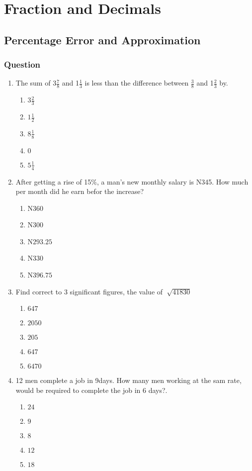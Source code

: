 \chapter{Fraction and Decimals}
\section{Percentage Error and Approximation}
\subsection{Question}
\begin{multicols}{2}
\begin{enumerate}[label={\arabic*.}]
\item The sum of 3\(\frac {7}{8}\) and 1\(\frac{1}{3}\) is less than the difference between \(\frac {3}{8}\) and 1\(\frac{2}{3}\) by.
    \begin{enumerate}[label={\Alph*.}]
    \item \(3\frac{2}{3}\)
    \item \(1\frac{1}{2}\)
    \item \(8\frac{1}{8}\)
    \item \(0\)
    \item \(5\frac{1}{4}\)

    \end{enumerate}
\item  After getting a rise of 15\%, a man's new monthly salary is N345. How much per month did he earn befor the increase? 
    \begin{enumerate}[label={\Alph*.}]
    \item N\(360\)
    \item N\(300\)
    \item N\(293.25\)
    \item N\(330\)
    \item N\(396.75\)

    \end{enumerate}
\item Find correct to 3 significant figures, the value of \(\sqrt[]{41830}\)
    \begin{enumerate}[label={\Alph*.}]
    \item \(647\)
    \item \(2050\)
    \item \(205\)
    \item \(647\)
    \item \(6470\)

    \end{enumerate}
\item 12 men complete a job in 9days. How many men working at the sam rate, would be required to complete the job in 6 days?. 
    \begin{enumerate}[label={\Alph*.}]
    \item \(24\)
    \item \(9\)
    \item \(8\)
    \item \(12\)
    \item \(18\)


\end{enumerate}
\end{enumerate}
\end{multicols}
